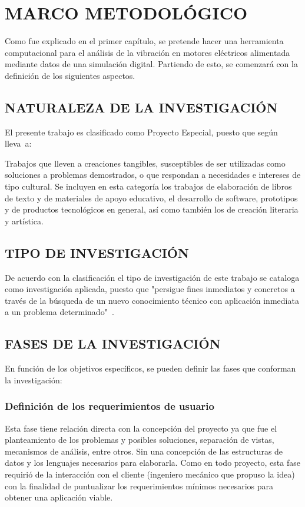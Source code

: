 \thispagestyle{empty}

\section{MARCO METODOLÓGICO}

Como fue explicado en el primer capítulo, se pretende hacer una herramienta
computacional para el análisis de la vibración en motores eléctricos alimentada
mediante datos de una simulación digital. Partiendo de esto, se comenzará
con la definición de los siguientes aspectos.

\subsection{NATURALEZA DE LA INVESTIGACIÓN}

El presente trabajo es clasificado como Proyecto Especial, puesto que según
\textcite{Hernandez} lleva~a:

\begin{center}
    \parbox[ht]{13.5 cm}{Trabajos que lleven a creaciones tangibles,
    susceptibles de ser utilizadas como soluciones a problemas demostrados, o
    que respondan a necesidades e intereses de tipo cultural. Se incluyen en
    esta categoría los trabajos de elaboración de libros de texto y de
    materiales de apoyo educativo, el desarrollo de software, prototipos y de
    productos tecnológicos en general, así como también los de creación
    literaria y artística.}
\end{center}


\subsection{TIPO DE INVESTIGACIÓN}

De acuerdo con la clasificación el tipo de investigación de este trabajo se
cataloga como investigación aplicada, puesto que "persigue fines inmediatos y
concretos a través de la búsqueda de un nuevo conocimiento técnico con aplicación
inmediata a un problema determinado"\ \textcite{Velez}.

\subsection{FASES DE LA INVESTIGACIÓN}

En función de los objetivos específicos, se pueden definir las fases que conforman
la investigación:

\subsubsection{Definición de los requerimientos de usuario}
Esta fase tiene relación directa con la concepción del proyecto ya que fue el
planteamiento de los problemas y posibles soluciones, separación de vistas,
mecanismos de análisis, entre otros. Sin una concepción  de las estructuras
de datos y los lenguajes necesarios para elaborarla.
Como en todo proyecto, esta fase requirió de la interacción con el cliente (ingeniero
mecánico que propuso la idea) con la finalidad de puntualizar los requerimientos
mínimos necesarios para obtener una aplicación viable.

